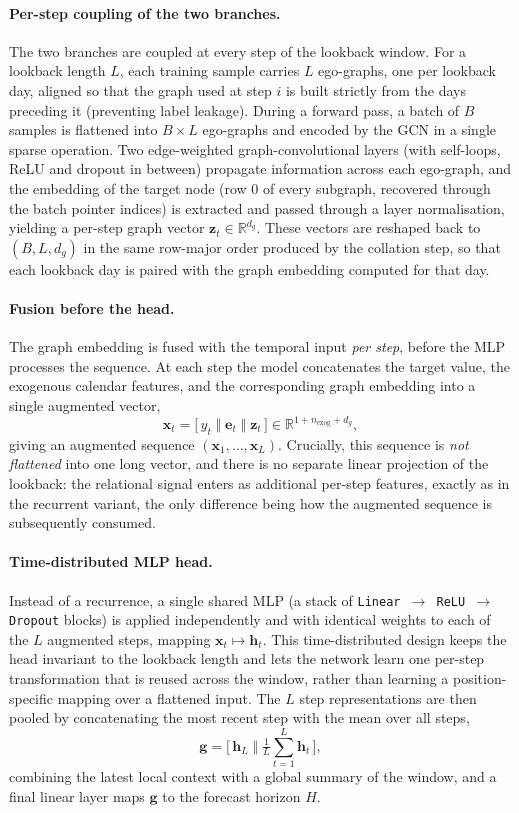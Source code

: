 \paragraph{Per-step coupling of the two branches.}
The two branches are coupled at every step of the lookback window. For a
lookback length $L$, each training sample carries $L$ ego-graphs, one per
lookback day, aligned so that the graph used at step $i$ is built strictly from
the days preceding it (preventing label leakage). During a forward pass, a
batch of $B$ samples is flattened into $B \times L$ ego-graphs and encoded by
the GCN in a single sparse operation. Two edge-weighted graph-convolutional
layers (with self-loops, ReLU and dropout in between) propagate information
across each ego-graph, and the embedding of the target node (row $0$ of every
subgraph, recovered through the batch pointer indices) is extracted and passed
through a layer normalisation, yielding a per-step graph vector
$\mathbf{z}_t \in \mathbb{R}^{d_g}$. These vectors are reshaped back to
$(B, L, d_g)$ in the same row-major order produced by the collation step, so
that each lookback day is paired with the graph embedding computed for that day.

\paragraph{Fusion before the head.}
The graph embedding is fused with the temporal input \emph{per step}, before
the MLP processes the sequence. At each step the model concatenates the target
value, the exogenous calendar features, and the corresponding graph embedding
into a single augmented vector,
\[
\mathbf{x}_t = \big[\, y_t \;\Vert\; \mathbf{e}_t \;\Vert\; \mathbf{z}_t \,\big]
\in \mathbb{R}^{1 + n_\text{exog} + d_g},
\]
giving an augmented sequence $(\mathbf{x}_1, \dots, \mathbf{x}_L)$. Crucially,
this sequence is \emph{not flattened} into one long vector, and there is no
separate linear projection of the lookback: the relational signal enters as
additional per-step features, exactly as in the recurrent variant, the only
difference being how the augmented sequence is subsequently consumed.

\paragraph{Time-distributed MLP head.}
Instead of a recurrence, a single shared MLP (a stack of
\texttt{Linear $\to$ ReLU $\to$ Dropout} blocks) is applied independently and
with identical weights to each of the $L$ augmented steps, mapping
$\mathbf{x}_t \mapsto \mathbf{h}_t$. This time-distributed design keeps the
head invariant to the lookback length and lets the network learn one per-step
transformation that is reused across the window, rather than learning a
position-specific mapping over a flattened input. The $L$ step
representations are then pooled by concatenating the most recent step with the
mean over all steps,
\[
\mathbf{g} = \big[\, \mathbf{h}_L \;\Vert\; \tfrac{1}{L}\textstyle\sum_{t=1}^{L}\mathbf{h}_t \,\big],
\]
combining the latest local context with a global summary of the window, and a
final linear layer maps $\mathbf{g}$ to the forecast horizon $H$.

